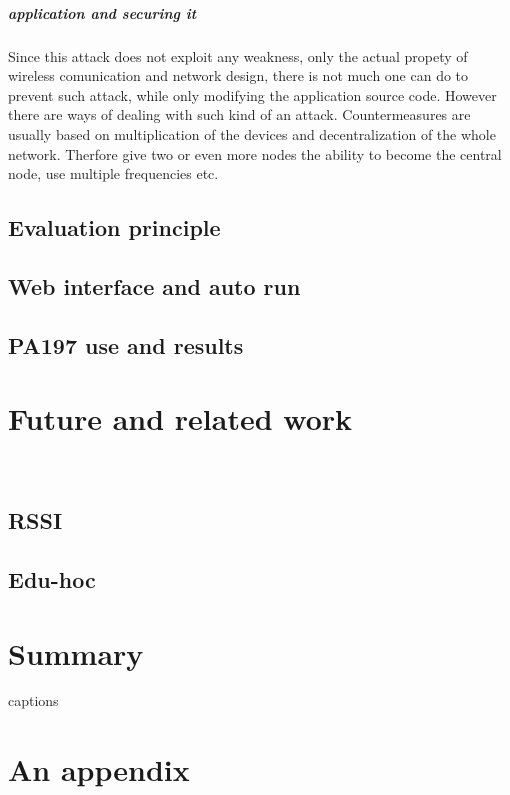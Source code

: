 \documentclass[
  digital, %
  table,   %
  nolof,     %
  nolot,     %
           oneside
]{fithesis3}
\begin{document}
    \paragraph{application and securing it}
    Since this attack does not exploit any weakness, only the actual propety of wireless comunication and network design, there is not much one can do to prevent such attack, while only modifying the application source code. However there are ways of dealing with such kind of an attack. Countermeasures are usually based on multiplication of the devices and decentralization of the whole network. Therfore give two or even more nodes the ability to become the central node, use multiple frequencies etc. %

  \section{Evaluation principle}\label{sec:eval}
  \section{Web interface and auto run}
  \section{PA197 use and results}
\chapter{Future and related work}\
  \section{RSSI}
  \section{Edu-hoc}
\chapter{Summary}




{\csname captions\languagename\endcsname %
\makeatletter %
  \thesis@selectLocale{\thesis@locale}\makeatother
\printbibliography[heading=bibintoc]} %

\appendix %
\chapter{An appendix}
\end{document}
